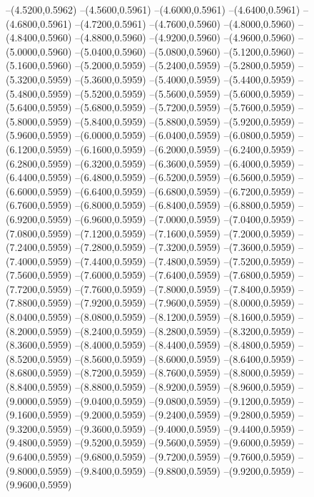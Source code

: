 {	--(4.5200,0.5962)
	--(4.5600,0.5961)
	--(4.6000,0.5961)
	--(4.6400,0.5961)
	--(4.6800,0.5961)
	--(4.7200,0.5961)
	--(4.7600,0.5960)
	--(4.8000,0.5960)
	--(4.8400,0.5960)
	--(4.8800,0.5960)
	--(4.9200,0.5960)
	--(4.9600,0.5960)
	--(5.0000,0.5960)
	--(5.0400,0.5960)
	--(5.0800,0.5960)
	--(5.1200,0.5960)
	--(5.1600,0.5960)
	--(5.2000,0.5959)
	--(5.2400,0.5959)
	--(5.2800,0.5959)
	--(5.3200,0.5959)
	--(5.3600,0.5959)
	--(5.4000,0.5959)
	--(5.4400,0.5959)
	--(5.4800,0.5959)
	--(5.5200,0.5959)
	--(5.5600,0.5959)
	--(5.6000,0.5959)
	--(5.6400,0.5959)
	--(5.6800,0.5959)
	--(5.7200,0.5959)
	--(5.7600,0.5959)
	--(5.8000,0.5959)
	--(5.8400,0.5959)
	--(5.8800,0.5959)
	--(5.9200,0.5959)
	--(5.9600,0.5959)
	--(6.0000,0.5959)
	--(6.0400,0.5959)
	--(6.0800,0.5959)
	--(6.1200,0.5959)
	--(6.1600,0.5959)
	--(6.2000,0.5959)
	--(6.2400,0.5959)
	--(6.2800,0.5959)
	--(6.3200,0.5959)
	--(6.3600,0.5959)
	--(6.4000,0.5959)
	--(6.4400,0.5959)
	--(6.4800,0.5959)
	--(6.5200,0.5959)
	--(6.5600,0.5959)
	--(6.6000,0.5959)
	--(6.6400,0.5959)
	--(6.6800,0.5959)
	--(6.7200,0.5959)
	--(6.7600,0.5959)
	--(6.8000,0.5959)
	--(6.8400,0.5959)
	--(6.8800,0.5959)
	--(6.9200,0.5959)
	--(6.9600,0.5959)
	--(7.0000,0.5959)
	--(7.0400,0.5959)
	--(7.0800,0.5959)
	--(7.1200,0.5959)
	--(7.1600,0.5959)
	--(7.2000,0.5959)
	--(7.2400,0.5959)
	--(7.2800,0.5959)
	--(7.3200,0.5959)
	--(7.3600,0.5959)
	--(7.4000,0.5959)
	--(7.4400,0.5959)
	--(7.4800,0.5959)
	--(7.5200,0.5959)
	--(7.5600,0.5959)
	--(7.6000,0.5959)
	--(7.6400,0.5959)
	--(7.6800,0.5959)
	--(7.7200,0.5959)
	--(7.7600,0.5959)
	--(7.8000,0.5959)
	--(7.8400,0.5959)
	--(7.8800,0.5959)
	--(7.9200,0.5959)
	--(7.9600,0.5959)
	--(8.0000,0.5959)
	--(8.0400,0.5959)
	--(8.0800,0.5959)
	--(8.1200,0.5959)
	--(8.1600,0.5959)
	--(8.2000,0.5959)
	--(8.2400,0.5959)
	--(8.2800,0.5959)
	--(8.3200,0.5959)
	--(8.3600,0.5959)
	--(8.4000,0.5959)
	--(8.4400,0.5959)
	--(8.4800,0.5959)
	--(8.5200,0.5959)
	--(8.5600,0.5959)
	--(8.6000,0.5959)
	--(8.6400,0.5959)
	--(8.6800,0.5959)
	--(8.7200,0.5959)
	--(8.7600,0.5959)
	--(8.8000,0.5959)
	--(8.8400,0.5959)
	--(8.8800,0.5959)
	--(8.9200,0.5959)
	--(8.9600,0.5959)
	--(9.0000,0.5959)
	--(9.0400,0.5959)
	--(9.0800,0.5959)
	--(9.1200,0.5959)
	--(9.1600,0.5959)
	--(9.2000,0.5959)
	--(9.2400,0.5959)
	--(9.2800,0.5959)
	--(9.3200,0.5959)
	--(9.3600,0.5959)
	--(9.4000,0.5959)
	--(9.4400,0.5959)
	--(9.4800,0.5959)
	--(9.5200,0.5959)
	--(9.5600,0.5959)
	--(9.6000,0.5959)
	--(9.6400,0.5959)
	--(9.6800,0.5959)
	--(9.7200,0.5959)
	--(9.7600,0.5959)
	--(9.8000,0.5959)
	--(9.8400,0.5959)
	--(9.8800,0.5959)
	--(9.9200,0.5959)
	--(9.9600,0.5959)
}
